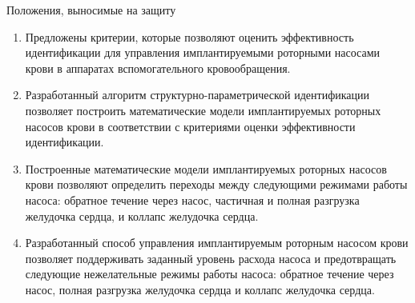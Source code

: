 \documentclass[a4paper, 9pt]{beamer}
\begin{document}
\begin{frame}{Положения, выносимые на защиту}
\small

\begin{enumerate}
  \item Предложены критерии, которые позволяют оценить эффективность идентификации для управления имплантируемыми роторными насосами крови в аппаратах вспомогательного кровообращения.
  \item Разработанный алгоритм структурно-параметрической идентификации позволяет построить математические модели имплантируемых роторных насосов крови в соответствии с критериями оценки эффективности идентификации.
  \item Построенные математические модели имплантируемых роторных насосов крови позволяют определить переходы между следующими режимами работы насоса: обратное течение через насос, частичная и полная разгрузка желудочка сердца, и коллапс желудочка сердца.
  \item Разработанный способ управления имплантируемым роторным насосом крови позволяет поддерживать заданный уровень расхода насоса и предотвращать следующие нежелательные режимы работы насоса: обратное течение через насос, полная разгрузка желудочка сердца и коллапс желудочка сердца. 
\end{enumerate}

\end{frame}

\end{document}
